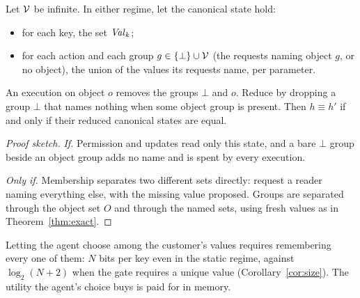 \begin{theorem}\label{thm:exact-sel}
Let $\mathcal{V}$ be infinite. In either regime, let the canonical state hold:
\begin{itemize}
\item for each key, the set $\mathit{Val}_k$;
\item for each action and each group $g \in \{\bot\} \cup \mathcal{V}$ (the requests naming object $g$, or no
  object), the union of the values its requests name, per parameter.
\end{itemize}
An execution on object $o$ removes the groups $\bot$ and $o$. Reduce by dropping a group $\bot$ that
names nothing when some object group is present. Then $h \equiv h'$ if and only if their reduced
canonical states are equal.
\end{theorem}
\begin{proof}[Proof sketch]
\emph{If.} Permission and updates read only this state, and a bare $\bot$ group beside an object
group adds no name and is spent by every execution.

\emph{Only if.} Membership separates two different sets directly: request a reader naming
everything else, with the missing value proposed. Groups are separated through the object set $O$
and through the named sets, using fresh values as in Theorem~\ref{thm:exact}.
\end{proof}

\begin{corollary}\label{cor:choice}
Letting the agent choose among the customer's values requires remembering every one of them: $N$
bits per key even in the static regime, against $\log_2(N + 2)$ when the gate requires a unique
value (Corollary~\ref{cor:size}). The utility the agent's choice buys is paid for in memory.
\end{corollary}

